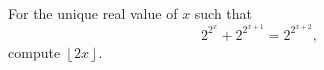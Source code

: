 For the unique real value of $x$ such that \[2^{2^x}+2^{2^{x+1}}=2^{2^{x+2}},\] compute $\left\lfloor2x\right\rfloor$.